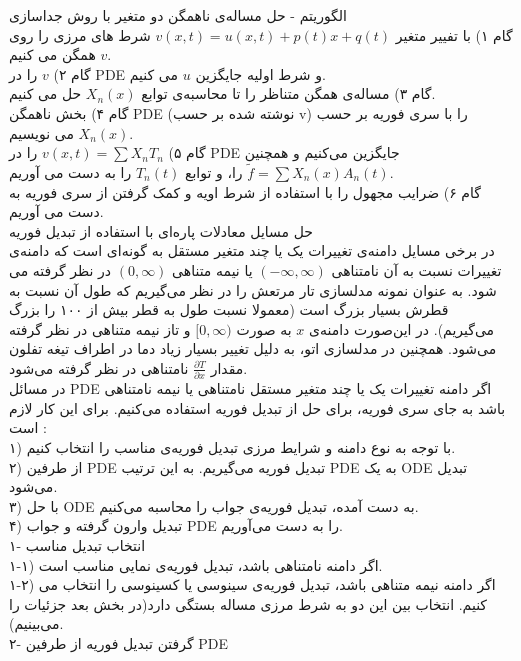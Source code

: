الگوریتم - حل مساله‌ی نا‌همگن دو متغیر با روش جدا‌سازی\\
گام ۱) با تفییر متغیر
$v(x,t)=u(x,t)+p(t)x+q(t)$
شرط های مرزی را روی
$v$
همگن می کنیم.\\
گام ۲) 
$v$
را در PDE و شرط اولیه جایگزین
$u$
می کنیم.\\
گام ۳) مساله‌ی همگن متناظر را تا محاسبه‌ی توابع
$X_n(x)$
حل می کنیم.\\
گام ۴) بخش ناهمگن PDE (نوشته شده بر حسب v) را با سری فوریه بر حسب
$X_n(x)$
می نویسیم.\\
گام ۵) 
$v(x,t)=\sum X_nT_n$
را در PDE جایگزین می‌کنیم و همچنین
$\tilde{f}=\sum X_n(x)A_n(t)$
را، و توابع
$T_n(t)$
را به دست می آوریم.\\
گام ۶) ضرایب مجهول را با استفاده از شرط اویه و کمک گرفتن از سری فوریه به دست می آوریم.\\
حل مسایل معادلات پاره‌ای با استفاده از تبدیل فوریه\\
در برخی مسایل دامنه‌ی تغییرات یک یا چند متغیر مستقل به گونه‌ای است که دامنه‌ی تغییرات نسبت به آن نامتناهی
$(-\infty,\infty)$
یا نیمه متناهی
$(0,\infty)$
در نظر گرفته می شود. به عنوان نمونه مدلسازی تار مرتعش را در نظر می‌گیریم که طول آن نسبت به قطرش بسیار بزرگ است (معمولا نسبت طول به قطر بیش از ۱۰۰ را بزرگ می‌گیریم). در این‌صورت دامنه‌ی
$x$
به صورت
$[0,\infty)$
و تاز نیمه متناهی در نظر گرفته می‌شود. همچنین در مدلسازی اتو، به دلیل تغییر بسیار زیاد دما در اطراف تیغه تفلون مقدار
$\frac{\partial T}{\partial x}$
نا‌متناهی در نظر گرفته‌ می‌شود.\\
در مسائل PDE اگر دامنه تغییرات یک یا چند متغیر مستقل نا‌متناهی یا نیمه نا‌متناهی باشد به جای سری فوریه، برای حل از تبدیل فوریه استفاده می‌کنیم. برای این کار لازم است :\\
۱) با توجه به نوع دامنه و شرایط مرزی تبدیل فوریه‌ی مناسب را انتخاب کنیم.\\
۲) از طرفین PDE تبدیل فوریه می‌گیریم. به این ترتیب PDE به یک ODE تبدیل می‌شود.\\
۳) با حل ODE به دست آمده، تبدیل فوریه‌ی جواب را محاسبه می‌کنیم.\\
۴) تبدیل وارون گرفته و جواب PDE را به دست می‌آوریم.\\
۱- انتخاب تبدیل مناسب\\
۱-۱) اگر دامنه نا‌متناهی باشد، تبدیل فوریه‌ی نمایی مناسب است.\\
۱-۲) اگر دامنه نیمه متناهی باشد، تبدیل فوریه‌ی سینوسی یا کسینوسی را انتخاب می کنیم. انتخاب بین این دو به شرط مرزی مساله بستگی دارد(در بخش بعد جزئیات را می‌بینیم).\\
۲- گرفتن تبدیل فوریه از طرفین PDE\\
